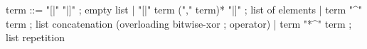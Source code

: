 \begin{syntax}
  term ::=  "[|" "|]" ; empty list
       | "[|" term ("," term)* "|]" ; list of elements
       | term "^" term ; list concatenation (overloading bitwise-xor 
                         ; operator)
       | term "*^" term ; list repetition
\end{syntax}

